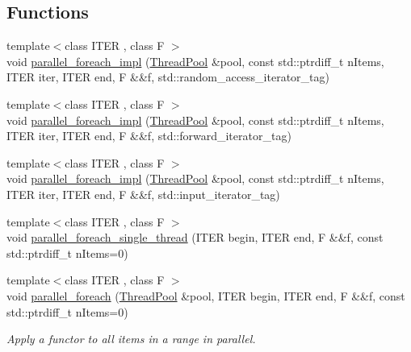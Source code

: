 \subsection*{Functions}
\begin{DoxyCompactItemize}
\item 
{\footnotesize template$<$class I\+T\+E\+R , class F $>$ }\\void \hyperlink{group__ParallelProcessing_ga7604490d8cf7a5b53de4477c866c8b86}{parallel\+\_\+foreach\+\_\+impl} (\hyperlink{classnifty_1_1parallel_1_1ThreadPool}{Thread\+Pool} \&pool, const std\+::ptrdiff\+\_\+t n\+Items, I\+T\+E\+R iter, I\+T\+E\+R end, F \&\&f, std\+::random\+\_\+access\+\_\+iterator\+\_\+tag)
\item 
{\footnotesize template$<$class I\+T\+E\+R , class F $>$ }\\void \hyperlink{group__ParallelProcessing_gab81648beb53aff67df1822f993b49ad1}{parallel\+\_\+foreach\+\_\+impl} (\hyperlink{classnifty_1_1parallel_1_1ThreadPool}{Thread\+Pool} \&pool, const std\+::ptrdiff\+\_\+t n\+Items, I\+T\+E\+R iter, I\+T\+E\+R end, F \&\&f, std\+::forward\+\_\+iterator\+\_\+tag)
\item 
{\footnotesize template$<$class I\+T\+E\+R , class F $>$ }\\void \hyperlink{group__ParallelProcessing_ga402d9e45f8edf065e6775e76a447f72e}{parallel\+\_\+foreach\+\_\+impl} (\hyperlink{classnifty_1_1parallel_1_1ThreadPool}{Thread\+Pool} \&pool, const std\+::ptrdiff\+\_\+t n\+Items, I\+T\+E\+R iter, I\+T\+E\+R end, F \&\&f, std\+::input\+\_\+iterator\+\_\+tag)
\item 
{\footnotesize template$<$class I\+T\+E\+R , class F $>$ }\\void \hyperlink{group__ParallelProcessing_ga53b7128ccb1cf52e5646440337ce4ece}{parallel\+\_\+foreach\+\_\+single\+\_\+thread} (I\+T\+E\+R begin, I\+T\+E\+R end, F \&\&f, const std\+::ptrdiff\+\_\+t n\+Items=0)
\item 
{\footnotesize template$<$class I\+T\+E\+R , class F $>$ }\\void \hyperlink{group__ParallelProcessing_ga505ac3d12ecde87341bce7b6f1027c88}{parallel\+\_\+foreach} (\hyperlink{classnifty_1_1parallel_1_1ThreadPool}{Thread\+Pool} \&pool, I\+T\+E\+R begin, I\+T\+E\+R end, F \&\&f, const std\+::ptrdiff\+\_\+t n\+Items=0)
\begin{DoxyCompactList}\small\item\em Apply a functor to all items in a range in parallel. \end{DoxyCompactList}\item 

\end{DoxyCompactItemize}
